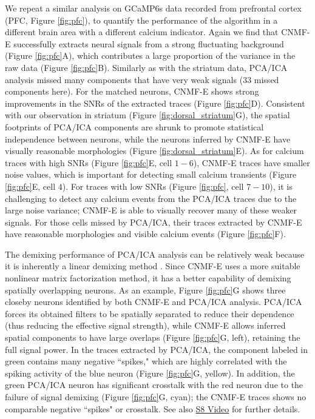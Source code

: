 \documentclass[9pt,lineno]{elife}
\begin{document}
We repeat a similar analysis on GCaMP6s data recorded from prefrontal cortex (PFC, Figure \ref{fig:pfc}), to quantify the performance of the algorithm in a different brain area with a different calcium indicator. Again we find that CNMF-E successfully extracts neural signals from a strong fluctuating background (Figure \ref{fig:pfc}A), which contributes a large proportion of the variance in the raw data (Figure \ref{fig:pfc}B). Similarly as with the striatum data, PCA/ICA analysis missed many components that have very weak signals ($33$ missed components here). For the matched neurons, CNMF-E shows strong improvements in the SNRs of the extracted traces (Figure \ref{fig:pfc}D). Consistent with our observation in striatum (Figure \ref{fig:dorsal_striatum}G), the spatial footprints of PCA/ICA components are shrunk to promote statistical independence between neurons, while the neurons inferred by CNMF-E have visually reasonable morphologies (Figure \ref{fig:dorsal_striatum}E). As for calcium traces with high SNRs (Figure \ref{fig:pfc}E, cell $1-6$), CNMF-E traces have smaller noise values, which is important for detecting small calcium transients (Figure \ref{fig:pfc}E, cell $4$).  For traces with low SNRs (Figure \ref{fig:pfc}, cell $7-10$), it is challenging to detect any calcium events from the PCA/ICA traces due to the large noise variance; CNMF-E is able to visually recover many of these weaker signals.  For those cells missed by PCA/ICA, their traces extracted by CNMF-E have reasonable morphologies and visible calcium events (Figure \ref{fig:pfc}F). 

The demixing performance of PCA/ICA analysis can be relatively weak because it is inherently a linear demixing method \citep{Pnevmatikakis2016}. Since CNMF-E uses a more suitable nonlinear matrix factorization method, it has a better capability of demixing spatially overlapping neurons. As an example, Figure \ref{fig:pfc}G shows three closeby neurons identified by both CNMF-E and PCA/ICA analysis. PCA/ICA forces its obtained filters to be spatially separated to reduce their dependence (thus reducing the effective signal strength), while CNMF-E allows inferred spatial components to have large overlaps (Figure \ref{fig:pfc}G, left), retaining the full signal power. In the traces extracted by PCA/ICA, the component labeled in green contains many negative ``spikes," which are highly correlated with the spiking activity of the blue neuron (Figure \ref{fig:pfc}G, yellow).
In addition, the green PCA/ICA neuron has significant crosstalk  with the red neuron due to the failure of signal demixing (Figure \ref{fig:pfc}G, cyan); the CNMF-E traces shows no comparable negative ``spikes" or crosstalk.  See also \href{http://www.columbia.edu/~pz2230/videos/pfc_overlapping.mp4}{S8 Video} for further details.
\end{document}
